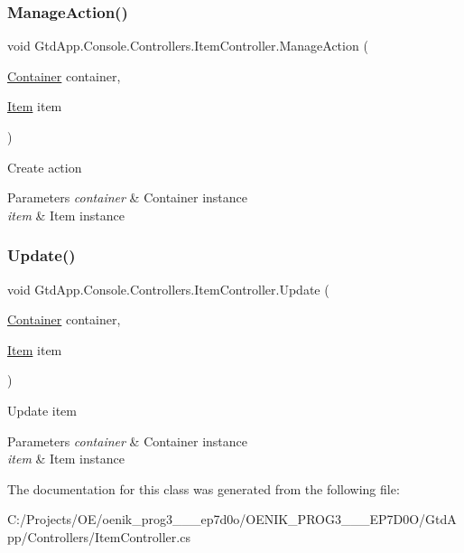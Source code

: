 \subsubsection{\texorpdfstring{Manage\+Action()}{ManageAction()}}
{\footnotesize\ttfamily void Gtd\+App.\+Console.\+Controllers.\+Item\+Controller.\+Manage\+Action (\begin{DoxyParamCaption}\item[{\mbox{\hyperlink{class_gtd_app_1_1_data_1_1_container}{Container}}}]{container,  }\item[{\mbox{\hyperlink{class_gtd_app_1_1_data_1_1_item}{Item}}}]{item }\end{DoxyParamCaption})}



Create action 


\begin{DoxyParams}{Parameters}
{\em container} & Container instance\\
\hline
{\em item} & Item instance\\
\hline
\end{DoxyParams}
\mbox{\label{class_gtd_app_1_1_console_1_1_controllers_1_1_item_controller_abf0df592b03edc253521c1b8c4f602e3}} 
\subsubsection{\texorpdfstring{Update()}{Update()}}
{\footnotesize\ttfamily void Gtd\+App.\+Console.\+Controllers.\+Item\+Controller.\+Update (\begin{DoxyParamCaption}\item[{\mbox{\hyperlink{class_gtd_app_1_1_data_1_1_container}{Container}}}]{container,  }\item[{\mbox{\hyperlink{class_gtd_app_1_1_data_1_1_item}{Item}}}]{item }\end{DoxyParamCaption})}



Update item 


\begin{DoxyParams}{Parameters}
{\em container} & Container instance\\
\hline
{\em item} & Item instance\\
\hline
\end{DoxyParams}


The documentation for this class was generated from the following file\+:\begin{DoxyCompactItemize}
\item 
C\+:/\+Projects/\+O\+E/oenik\+\_\+prog3\+\_\+\_\+\_\+ep7d0o/\+O\+E\+N\+I\+K\+\_\+\+P\+R\+O\+G3\+\_\+\_\+\_\+\+E\+P7\+D0\+O/\+Gtd\+App/\+Controllers/Item\+Controller.\+cs\end{DoxyCompactItemize}
